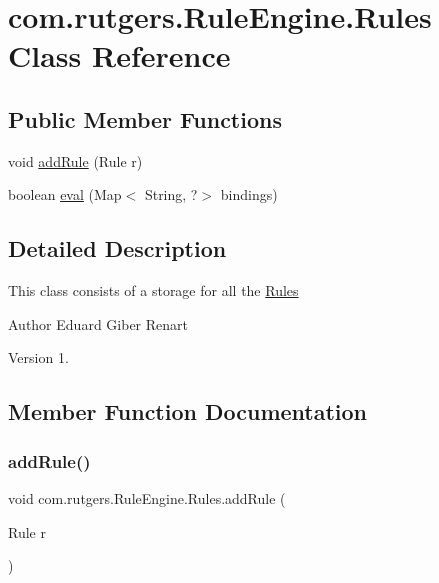 \hypertarget{classcom_1_1rutgers_1_1RuleEngine_1_1Rules}{}\section{com.\+rutgers.\+Rule\+Engine.\+Rules Class Reference}
\label{classcom_1_1rutgers_1_1RuleEngine_1_1Rules}
\subsection*{Public Member Functions}
\begin{DoxyCompactItemize}
\item 
void \hyperlink{classcom_1_1rutgers_1_1RuleEngine_1_1Rules_aecfbc73a8d7fb72159a42c0646ba49f9}{add\+Rule} (Rule r)
\item 
boolean \hyperlink{classcom_1_1rutgers_1_1RuleEngine_1_1Rules_a4a0df8e66e124b6b6134a144dc6cb656}{eval} (Map$<$ String, ?$>$ bindings)
\end{DoxyCompactItemize}


\subsection{Detailed Description}
This class consists of a storage for all the \hyperlink{classcom_1_1rutgers_1_1RuleEngine_1_1Rules}{Rules}

\begin{DoxyAuthor}{Author}
Eduard Giber Renart 
\end{DoxyAuthor}
\begin{DoxyVersion}{Version}
1. 
\end{DoxyVersion}


\subsection{Member Function Documentation}
\mbox{\label{classcom_1_1rutgers_1_1RuleEngine_1_1Rules_aecfbc73a8d7fb72159a42c0646ba49f9}} 
\subsubsection{\texorpdfstring{add\+Rule()}{addRule()}}
{\footnotesize\ttfamily void com.\+rutgers.\+Rule\+Engine.\+Rules.\+add\+Rule (\begin{DoxyParamCaption}\item[{Rule}]{r }\end{DoxyParamCaption})}

